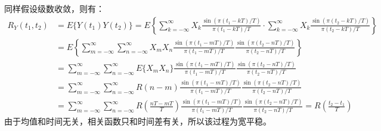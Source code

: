 同样假设级数收敛，则有：
\begin{equation}\tag*{}
\begin{split}
R_Y(t_1, t_2)&=E\{Y(t_1)Y(t_2)\}=E\left\{\sum_{k=-\infty}^{\infty}X_k\frac{\sin(\pi(t_1-kT)/T)}{\pi(t_1-kT)/T}\cdot\sum_{k=-\infty}^{\infty}X_k\frac{\sin(\pi(t_2-kT)/T)}{\pi(t_2-kT)/T}\right\}\\
&=E\left\{\sum_{m=-\infty}^{\infty}\sum_{n=-\infty}^{\infty}X_mX_n\frac{\sin(\pi(t_1-mT)/T)}{\pi(t_1-mT)/T}\frac{\sin(\pi(t_2-nT)/T)}{\pi(t_2-nT)/T}\right\}\\
&=\sum_{m=-\infty}^{\infty}\sum_{n=-\infty}^{\infty}E\{X_mX_n\}\frac{\sin(\pi(t_1-mT)/T)}{\pi(t_1-mT)/T}\frac{\sin(\pi(t_2-nT)/T)}{\pi(t_2-nT)/T}\\
&=\sum_{m=-\infty}^{\infty}\sum_{n=-\infty}^{\infty}R(n-m)\frac{\sin(\pi(t_1-mT)/T)}{\pi(t_1-mT)/T}\frac{\sin(\pi(t_2-nT)/T)}{\pi(t_2-nT)/T}\\
&=\sum_{m=-\infty}^{\infty}\sum_{n=-\infty}^{\infty}R\left(\frac{nT-mT}{T}\right)\frac{\sin(\pi(t_1-mT)/T)}{\pi(t_1-mT)/T}\frac{\sin(\pi(t_2-nT)/T)}{\pi(t_2-nT)/T}=R\left(\frac{t_2-t_1}{T}\right)
\end{split}
\end{equation}
由于均值和时间无关，相关函数只和时间差有关，所以该过程为宽平稳。